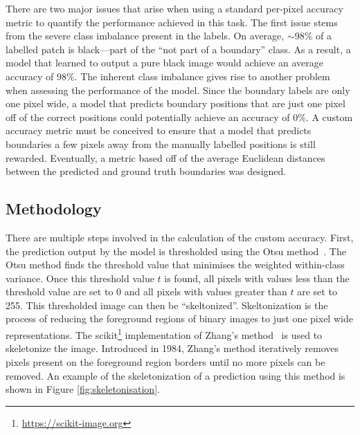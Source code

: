 There are two major issues that arise when using a standard per-pixel accuracy metric to quantify the performance achieved in this task. The first issue stems from the severe class imbalance present in the labels. On average, ${\sim}$98\% of a labelled patch is black---part of the ``not part of a boundary'' class. As a result, a model that learned to output a pure black image would achieve an average accuracy of 98\%. The inherent class imbalance gives rise to another problem when assessing the performance of the model. Since the boundary labels are only one pixel wide, a model that predicts boundary positions that are just one pixel off of the correct positions could potentially achieve an accuracy of 0\%. A custom accuracy metric must be conceived to ensure that a model that predicts boundaries a few pixels away from the manually labelled positions is still rewarded. Eventually, a metric based off of the average Euclidean distances between the predicted and ground truth boundaries was designed.

\subsection{Methodology}

There are multiple steps involved in the calculation of the custom accuracy. First, the prediction output by the model is thresholded using the Otsu method~\cite{otsu}. The Otsu method finds the threshold value that minimises the weighted within-class variance. Once this threshold value $t$ is found, all pixels with values less than the threshold value are set to 0 and all pixels with values greater than $t$ are set to 255. This thresholded image can then be ``skeltonized''. Skeltonization is the process of reducing the foreground regions of binary images to just one pixel wide representations. The scikit\footnote{\url{https://scikit-image.org}} implementation of Zhang's method~\cite{zhang} is used to skeletonize the image. Introduced in 1984, Zhang's method iteratively removes pixels present on the foreground region borders until no more pixels can be removed. An example of the skeletonization of a prediction using this method is shown in Figure \ref{fig:skeletonisation}.

